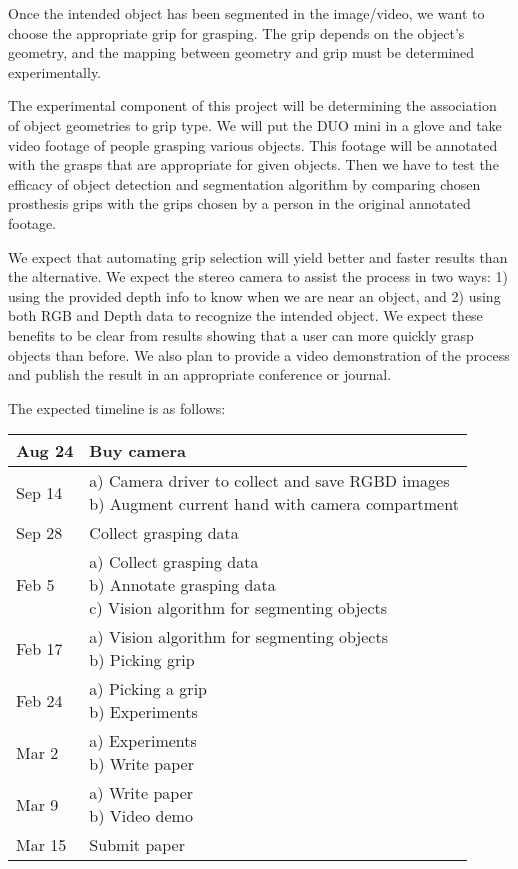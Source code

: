 \documentclass[12pt]{article}
\begin{document}
Once the intended object has been segmented in the image/video, we want to
choose the appropriate grip for grasping. The grip depends on the object’s
geometry, and the mapping between geometry and grip must be determined
experimentally. \newline

The experimental component of this project will be determining the association
of object geometries to grip type. We will put the DUO mini in a glove and take
video footage of people grasping various objects. This footage will be annotated
with the grasps that are appropriate for given objects. Then we have to test the
efficacy of object detection and segmentation algorithm by comparing chosen
prosthesis grips with the grips chosen by a person in the original annotated
footage. \newline

We expect that automating grip selection will yield better and faster results
than the alternative. We expect the stereo camera to assist the process in two
ways: 1) using the provided depth info to know when we are near an object, and
2) using both RGB and Depth data to recognize the intended object. We expect
these benefits to be clear from results showing that a user can more quickly
grasp objects than before. We also plan to provide a video demonstration of the
process and publish the result in an appropriate conference or journal. \newline

The expected timeline is as follows: \newline
\begin{tabular}{| l | l |}
\hline
Aug 24 & Buy camera \\ \hline
Sep 14 & \pbox{20cm}{a) Camera driver to collect and save RGBD images \\
                     b) Augment current hand with camera compartment  } \\ \hline
Sep 28 & Collect grasping data \\ \hline
Feb 5 & \pbox{20cm}{a) Collect grasping data \\
                    b) Annotate grasping data \\
                    c) Vision algorithm for segmenting objects} \\ \hline
Feb 17 & \pbox{20cm}{a) Vision algorithm for segmenting objects \\
                     b) Picking grip} \\ \hline
Feb 24 & \pbox{20cm}{a) Picking a grip \\
                     b) Experiments} \\ \hline
Mar 2 & \pbox{20cm}{a) Experiments \\
                      b) Write paper} \\ \hline
Mar 9 & \pbox{20cm}{a) Write paper \\
                    b) Video demo} \\ \hline
Mar 15 & Submit paper \\ \hline
\end{tabular}
\end{document}
